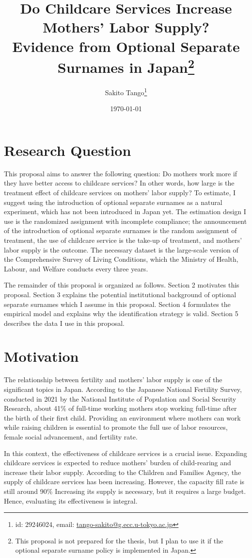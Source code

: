 \documentclass[12pt]{article}
\title{Do Childcare Services Increase Mothers' Labor Supply?\\
       Evidence from Optional Separate Surnames in Japan\thanks{
        This proposal is not prepared for the thesis, but I plan to use it if the optional separate surname policy is implemented in Japan.
       }
       }
\author{Sakito Tango\thanks{id: 29246024, 
        email: \href{mailto:tango-sakito@g.ecc.u-tokyo.ac.jp}{tango-sakito@g.ecc.u-tokyo.ac.jp}
}
}
\date{\today}
\begin{document}
\maketitle

\section{Research Question}
This proposal aims to answer the following question: Do mothers work more if they have better access to childcare services? 
In other words, how large is the treatment effect of childcare services on mothers' labor supply?
To estimate, I suggest using the introduction of optional separate surnames as a natural experiment, which has not been introduced in Japan yet.
The estimation design I use is the randomized assignment with incomplete compliance; the announcement of the introduction of optional separate surnames is the random assignment of treatment, the use of childcare service is the take-up of treatment, and mothers' labor supply is the outcome.
The necessary dataset is the large-scale version of the Comprehensive Survey of Living Conditions, which the Ministry of Health, Labour, and Welfare conducts every three years.


The remainder of this proposal is organized as follows. 
Section 2 motivates this proposal. 
Section 3 explains the potential institutional background of optional separate surnames which I assume in this proposal.
Section 4 formulates the empirical model and explains why the identification strategy is valid.
Section 5 describes the data I use in this proposal.


\section{Motivation}
The relationship between fertility and mothers' labor supply is one of the significant topics in Japan. 
According to the Japanese National Fertility Survey, conducted in 2021 by the National Institute of Population and Social Security Research, about 41\%  of full-time working mothers stop working full-time after the birth of their first child.
Providing an environment where mothers can work while raising children is essential to promote the full use of labor resources, female social advancement, and fertility rate.


In this context, the effectiveness of childcare services is a crucial issue. 
Expanding childcare services is expected to reduce mothers' burden of child-rearing and increase their labor supply.
According to the Children and Families Agency, the supply of childcare services has been increasing. 
However, the capacity fill rate is still around 90\%
Increasing its supply is necessary, but it requires a large budget.
Hence, evaluating its effectiveness is integral.
\end{document}
